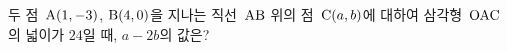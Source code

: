 두 점~$\mathrm{A}(1{,}\mkern3mu\mathopen{}-3)$, $\mathrm{B}(4{,}\mkern3mu\mathopen{}0)$을 지나는 직선~$\mathrm{AB}$ 위의 점~$\mathrm{C}(a{,}\mkern3mu\mathopen{}b)$에 대하여 삼각형~$\mathrm{OAC}$의 넓이가 $24$일 때, $a-2b$의 값은? 

